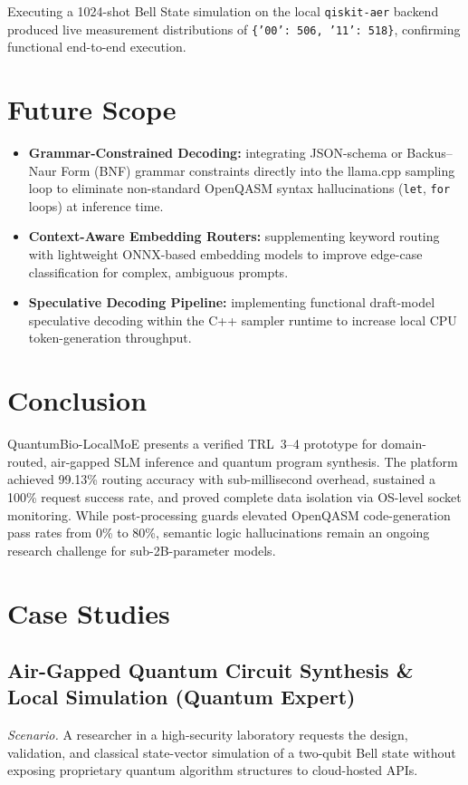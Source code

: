 \documentclass[journal]{IEEEtran}
\begin{document}
Executing a 1024-shot Bell State simulation on the local \texttt{qiskit-aer}
backend~\cite{qiskit} produced live measurement distributions of
\texttt{\{'00': 506, '11': 518\}}, confirming functional end-to-end execution.

\section{Future Scope}
\begin{itemize}
\item \textbf{Grammar-Constrained Decoding:} integrating JSON-schema or
Backus--Naur Form (BNF) grammar constraints directly into the llama.cpp sampling
loop to eliminate non-standard OpenQASM syntax hallucinations
(\texttt{let}, \texttt{for} loops) at inference time.
\item \textbf{Context-Aware Embedding Routers:} supplementing keyword routing
with lightweight ONNX-based embedding models to improve edge-case classification
for complex, ambiguous prompts.
\item \textbf{Speculative Decoding Pipeline:} implementing functional draft-model
speculative decoding within the C++ sampler runtime to increase local CPU
token-generation throughput.
\end{itemize}

\section{Conclusion}
QuantumBio-LocalMoE presents a verified TRL~3--4 prototype for domain-routed,
air-gapped SLM inference and quantum program synthesis. The platform achieved
99.13\% routing accuracy with sub-millisecond overhead, sustained a 100\% request
success rate, and proved complete data isolation via OS-level socket monitoring.
While post-processing guards elevated OpenQASM code-generation pass rates from
0\% to 80\%, semantic logic hallucinations remain an ongoing research challenge
for sub-2B-parameter models.

\section{Case Studies}
\subsection{Air-Gapped Quantum Circuit Synthesis \& Local Simulation (Quantum Expert)}
\textit{Scenario.} A researcher in a high-security laboratory requests the
design, validation, and classical state-vector simulation of a two-qubit Bell
state without exposing proprietary quantum algorithm structures to cloud-hosted
APIs.
\end{document}
